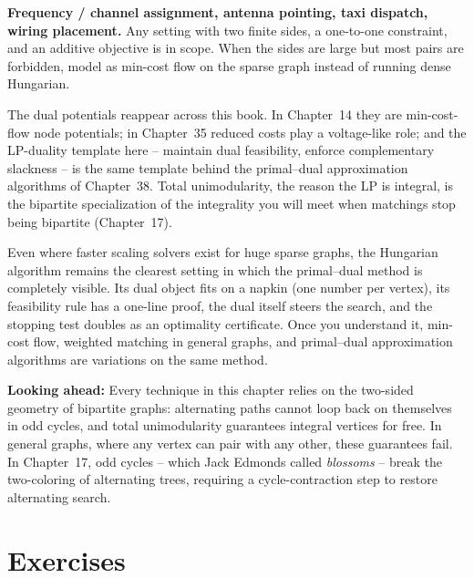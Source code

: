 \begin{applicationbox}
\textbf{Frequency / channel assignment, antenna pointing, taxi dispatch, wiring placement.} Any setting with two finite sides, a one-to-one constraint, and an additive objective is in scope. When the sides are large but most pairs are forbidden, model as min-cost flow on the sparse graph instead of running dense Hungarian.
\end{applicationbox}

\begin{connectionbox}
The dual potentials reappear across this book. In Chapter~14 they are min-cost-flow node potentials; in Chapter~35 reduced costs play a voltage-like role; and the LP-duality template here -- maintain dual feasibility, enforce complementary slackness -- is the same template behind the primal--dual approximation algorithms of Chapter~38. Total unimodularity, the reason the LP is integral, is the bipartite specialization of the integrality you will meet when matchings stop being bipartite (Chapter~17).
\end{connectionbox}

\begin{aestheticbox}
Even where faster scaling solvers exist for huge sparse graphs, the Hungarian algorithm remains the clearest setting in which the primal--dual method is completely visible. Its dual object fits on a napkin (one number per vertex), its feasibility rule has a one-line proof, the dual itself steers the search, and the stopping test doubles as an optimality certificate. Once you understand it, min-cost flow, weighted matching in general graphs, and primal--dual approximation algorithms are variations on the same method.

\textbf{Looking ahead:} Every technique in this chapter relies on the two-sided geometry of bipartite graphs: alternating paths cannot loop back on themselves in odd cycles, and total unimodularity guarantees integral vertices for free. In general graphs, where any vertex can pair with any other, these guarantees fail. In Chapter~17, odd cycles -- which Jack Edmonds called \emph{blossoms} -- break the two-coloring of alternating trees, requiring a cycle-contraction step to restore alternating search.
\end{aestheticbox}

\section{Exercises}
\label{ch16:exercises}

